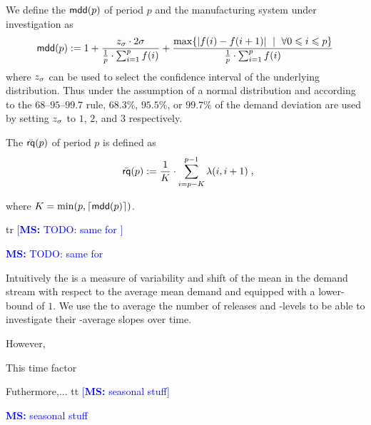 \documentclass[mnsc]{informs3}
\DeclarePairedDelimiter{\ceil}{\lceil}{\rceil}
\newcommand\MS[2][r]{\ifx t#1 \textcolor{blue}{[\textbf{MS:} #2]}
  \else \begin{center}\textcolor{blue}{\textbf{MS:} #2} \end{center} \fi}
\begin{document}
\begin{definition}
  We define the \emph{\mddname{}} $\mathsf{mdd}(p)$ of period $p$ and the manufacturing system
  under investigation as
  \begin{align*}
    \mathsf{mdd}(p) \mathrel{:=} 1 +
    \frac{ z_{\sigma} \cdot 2 \sigma}{\frac{1}{p} \cdot \sum_{i=1}^{p}{f(i)}}  +
    \frac{\max \{|f(i)-f(i+1)|\ \mid \ \forall 0 \leqslant i \leqslant p \}}{\frac{1}{p} \cdot \sum_{i=1}^{p}{f(i)}}
  \end{align*}
  where $z_{\sigma}$ can be used to select the confidence interval of the underlying distribution. Thus
  under the assumption of a normal distribution and according to the $68$--$95$--$99.7$ rule,
  $68.3\%$, $95.5\%$, or $99.7\%$ of the demand deviation are used by setting $z_{\sigma}$ to $1$, $2$, and
  $3$ respectively.
\end{definition}

\begin{definition}
  The \emph{\avgrqname} $\bar{\mathsf{rq}}(p)$ of period $p$ is defined as
  \begin{align*}
    \avgrq{p} \defsym \frac{1}{K} \cdot \sum_{i=p-K}^{p-1}{ \ri{i}{i+1} }\tcom
  \end{align*}

  where $K=\min(p,\ceil{\mdd{p}})$.
\end{definition}

\MS{TODO: same for \WIP{}}


Intuitively the \mddname{} is a measure of variability and shift of the mean in the demand stream
with respect to the average mean demand and equipped with a lower-bound of $1$. We use the
\mddname{} to average the number of releases and \WIP{}-levels to be able to investigate their
\textsl{\mddname{}}-average slopes over time.



However,

This time factor


Futhermore,... \MS[t]{seasonal stuff}
%
\end{document}
